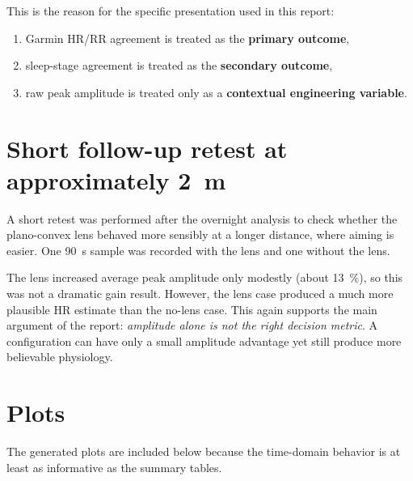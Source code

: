 \documentclass[11pt,a4paper]{article}
\begin{document}
This is the reason for the specific presentation used in this report:
\begin{enumerate}
    \item Garmin HR/RR agreement is treated as the \textbf{primary outcome},
    \item sleep-stage agreement is treated as the \textbf{secondary outcome},
    \item raw peak amplitude is treated only as a \textbf{contextual engineering variable}. 
\end{enumerate}

\section{Short follow-up retest at approximately \SI{2}{m}}
A short retest was performed after the overnight analysis to check whether the plano-convex lens behaved more sensibly at a longer distance, where aiming is easier. One \SI{90}{s} sample was recorded with the lens and one without the lens.

\begin{table}[H]
\centering
\caption{Short \SI{2}{m} timed retest: lens vs. no lens.}
\label{tab:2mtest}
\end{table}

The lens increased average peak amplitude only modestly (about \SI{13}{\percent}), so this was not a dramatic gain result. However, the lens case produced a much more plausible HR estimate than the no-lens case. This again supports the main argument of the report: \emph{amplitude alone is not the right decision metric}. A configuration can have only a small amplitude advantage yet still produce more believable physiology.

\section{Plots}
The generated plots are included below because the time-domain behavior is at least as informative as the summary tables.
\end{document}

